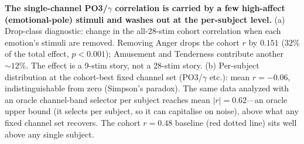 \textbf{The single-channel PO3/$\gamma$ correlation is carried by a few high-affect (emotional-pole) stimuli and washes out at the per-subject level.}
(a) Drop-class diagnostic: change in the all-28-stim cohort correlation when each emotion's stimuli are removed.
Removing Anger drops the cohort $r$ by $0.151$ ($32\%$ of the total effect, $p{<}0.001$); Amusement and Tenderness contribute another $\sim\!12\%$.
The effect is a 9-stim story, not a 28-stim story.
(b) Per-subject distribution at the cohort-best fixed channel set (PO3/$\gamma$ etc.): mean $r{=}{-}0.06$, indistinguishable from zero (Simpson's paradox).
The same data analyzed with an oracle channel-band selector per subject reaches mean $|r|{=}0.62$---an oracle upper bound (it selects per subject, so it can capitalise on noise), above what any fixed channel set recovers.
The cohort $r{=}0.48$ baseline (red dotted line) sits well above any single subject.
